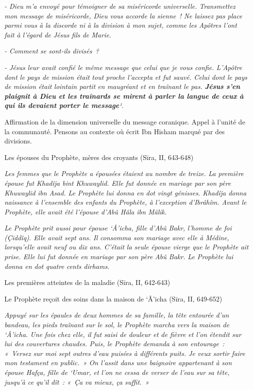 \emph{- Dieu m'a envoyé pour témoigner de sa miséricorde universelle.
Transmettez mon message de miséricorde, Dieu vous accorde la sienne~! Ne
laissez pas place parmi vous à la discorde ni à la division à mon sujet,
comme les Apôtres l'ont fait à l'égard de Jésus fils de Marie.}

\emph{- Comment se sont-ils divisés~?}

\emph{- Jésus leur avait confié le même message que celui que je vous
confie. L'Apôtre dont le pays de mission était tout proche l'accepta et
fut sauvé. Celui dont le pays de mission était lointain partit en
maugréant et en traînant le pas. \textbf{Jésus s'en plaignit à Dieu et
les traînards se mirent à parler la langue de ceux à qui ils devaient
porter le message}¹.}

Affirmation de la dimension universelle du message coranique. Appel à
l'unité de la communauté. Pensons au contexte où écrit Ibn Hīsham marqué
par des divisions.

Les épouses du Prophète, mères des croyants (Sīra, II, 643-648)

\emph{Les femmes que le Prophète a épousées étaient au nombre de treize.
La première épouse fut Khadîja bint Khuwaylid. Elle fut donnée en
mariage par son père Khuwaylid ibn Asad. Le Prophète lui donna en dot
vingt génisses. Khadîja donna naissance à l'ensemble des enfants du
Prophète, à l'exception d'Ibrâhîm. Avant le Prophète, elle avait été
l'épouse d'Abû Hâla ibn Mâlik.}

\emph{Le Prophète prit aussi pour épouse `Â'icha, fille d'Abû Bakr,
l'homme de foi (Çiddîq). Elle avait sept ans. Il consomma son mariage
avec elle à Médine, lorsqu'elle avait neuf ou dix ans. C'était la seule
épouse vierge que le Prophète ait prise. Elle lui fut donnée en mariage
par son père Abû Bakr. Le Prophète lui donna en dot quatre cents
dirhams.}


Les premières atteintes de la maladie (Sīra, II, 642-643)

Le Prophète reçoit des soins dans la maison de `Â'icha (Sīra, II,
649-652)

\emph{Appuyé sur les épaules de deux hommes de sa famille, la tête
entourée d'un bandeau, les pieds traînant sur le sol, le Prophète marcha
vers la maison de `Â'icha. Une fois chez elle, il fut saisi de douleur
et de fièvre et l'on étendit sur lui des couvertures chaudes. Puis, le
Prophète demanda à son entourage~: «~Versez sur moi sept outres d'eau
puisées à différents puits. Je veux sortir faire mon testament en
public.~» On l'assit dans une baignoire appartenant à son épouse Hafça,
fille de `Umar, et l'on ne cessa de verser de l'eau sur sa tête, jusqu'à
ce qu'il dît~: «~Ça va mieux, ça suffit.~»}

